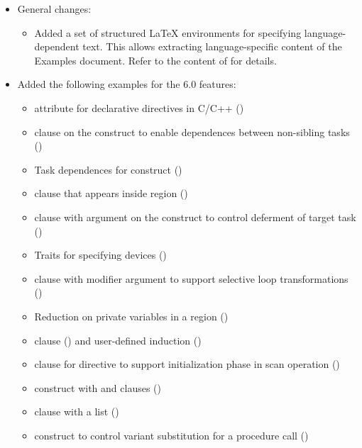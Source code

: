 \begin{itemize}
\item General changes:
\begin{itemize}
  \item Added a set of structured LaTeX environments for specifying
    language-dependent text.  This allows extracting language-specific
    content of the Examples document.  Refer to the content of
     for details.
\end{itemize}

\item Added the following examples for the 6.0 features:
\begin{itemize}
  \item {} attribute for declarative directives in C/C++
    ()
  \item {} clause on the  construct to enable dependences
     between non-sibling tasks ()
  \item Task dependences for  construct
    ()
  \item {} clause that appears inside  region
    ()
  \item {} clause with argument on the  construct to control deferment 
     of target task ()
  \item Traits for specifying devices ()
  \item {} clause with modifier argument to 
    support selective loop transformations
    ()
  \item Reduction on private variables in a  region
    ()
  \item {} clause ()
    and user-defined induction ()
  \item {} clause for  directive to 
    support initialization phase in scan operation
    ()
  \item {} construct with  and  clauses ()
  \item {} clause with a list
    ()
  \item {} construct to control variant substitution
    for a procedure call ()
\end{itemize}


\end{itemize}
